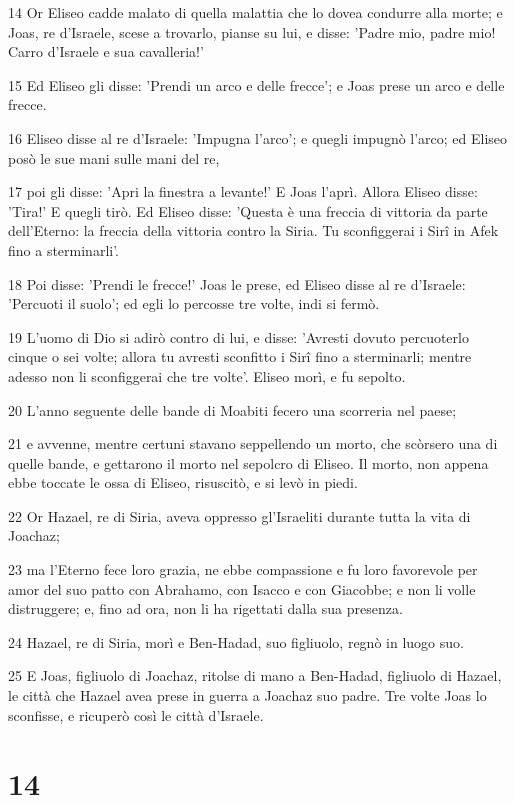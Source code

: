 \par 14 Or Eliseo cadde malato di quella malattia che lo dovea condurre alla morte; e Joas, re d'Israele, scese a trovarlo, pianse su lui, e disse: 'Padre mio, padre mio! Carro d'Israele e sua cavalleria!'
\par 15 Ed Eliseo gli disse: 'Prendi un arco e delle frecce'; e Joas prese un arco e delle frecce.
\par 16 Eliseo disse al re d'Israele: 'Impugna l'arco'; e quegli impugnò l'arco; ed Eliseo posò le sue mani sulle mani del re,
\par 17 poi gli disse: 'Apri la finestra a levante!' E Joas l'aprì. Allora Eliseo disse: 'Tira!' E quegli tirò. Ed Eliseo disse: 'Questa è una freccia di vittoria da parte dell'Eterno: la freccia della vittoria contro la Siria. Tu sconfiggerai i Sirî in Afek fino a sterminarli'.
\par 18 Poi disse: 'Prendi le frecce!' Joas le prese, ed Eliseo disse al re d'Israele: 'Percuoti il suolo'; ed egli lo percosse tre volte, indi si fermò.
\par 19 L'uomo di Dio si adirò contro di lui, e disse: 'Avresti dovuto percuoterlo cinque o sei volte; allora tu avresti sconfitto i Sirî fino a sterminarli; mentre adesso non li sconfiggerai che tre volte'. Eliseo morì, e fu sepolto.
\par 20 L'anno seguente delle bande di Moabiti fecero una scorreria nel paese;
\par 21 e avvenne, mentre certuni stavano seppellendo un morto, che scòrsero una di quelle bande, e gettarono il morto nel sepolcro di Eliseo. Il morto, non appena ebbe toccate le ossa di Eliseo, risuscitò, e si levò in piedi.
\par 22 Or Hazael, re di Siria, aveva oppresso gl'Israeliti durante tutta la vita di Joachaz;
\par 23 ma l'Eterno fece loro grazia, ne ebbe compassione e fu loro favorevole per amor del suo patto con Abrahamo, con Isacco e con Giacobbe; e non li volle distruggere; e, fino ad ora, non li ha rigettati dalla sua presenza.
\par 24 Hazael, re di Siria, morì e Ben-Hadad, suo figliuolo, regnò in luogo suo.
\par 25 E Joas, figliuolo di Joachaz, ritolse di mano a Ben-Hadad, figliuolo di Hazael, le città che Hazael avea prese in guerra a Joachaz suo padre. Tre volte Joas lo sconfisse, e ricuperò così le città d'Israele.

\chapter{14}

